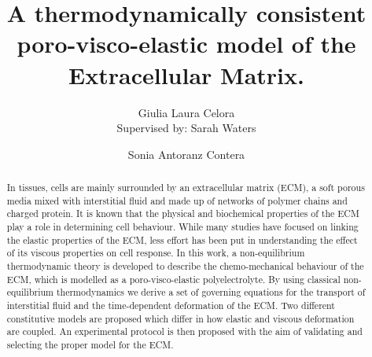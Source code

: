 \documentclass[runningheads]{llncs}
\begin{document}
\title{A thermodynamically consistent poro-visco-elastic model of the Extracellular Matrix.}
%
%
\author{Giulia Laura Celora \\[0.5cm]{\normalfont Supervised by:} Sarah Waters  \and Sonia Antoranz Contera}
%
%
\maketitle 
\begin{abstract}
In tissues, cells are mainly surrounded by an extracellular matrix (ECM), a soft porous media mixed with interstitial fluid and made up of networks of polymer chains and charged protein. It is known that the physical and biochemical properties of the ECM play a role in determining cell behaviour. While many studies have focused on linking the elastic properties of the ECM, less effort has been put in understanding the effect of its viscous properties on cell response. In this work, a non-equilibrium thermodynamic theory is developed to describe the chemo-mechanical behaviour of the ECM, which is modelled as a poro-visco-elastic polyelectrolyte. By using classical non-equilibrium thermodynamics we derive a set of governing equations for the transport of interstitial fluid and the time-dependent deformation of the ECM. Two different constitutive models are proposed which differ in how elastic and viscous deformation are coupled. An experimental protocol is then proposed with the aim of validating and selecting the proper model for the ECM.
\end{abstract}
%


\end{document}
